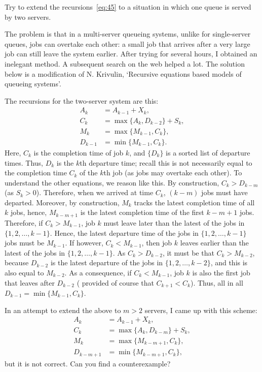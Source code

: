 \begin{extra} Try to extend the recursions~\cref{eq:45} to a situation in which one queue is
 served by two servers. 
\begin{hint} The problem is
 that in a multi-server queueing systems, unlike for
 single-server queues, jobs can overtake each other: a small job
 that arrives after a very large job can still leave the system
 earlier. After trying for several hours, I obtained an inelegant
 method. A subsequent search on the web helped a lot. The
 solution below is a modification of N. Krivulin, `Recursive
 equations based models of queueing systems'. 
\end{hint}
\begin{solution}
The recursions for the two-server system are this: 
 \begin{equation*}
 \begin{split}
 A_k &= A_{k-1} + X_k, \\
 C_k &= \max\{A_k, D_{k-2}\} + S_k,\\
 M_k &= \max\{M_{k-1}, C_k\}, \\
 D_{k-1} &= \min\{M_{k-1}, C_k\}.
 \end{split}
 \end{equation*}
 Here, $C_k$ is the completion time of job $k$, and $\{D_k\}$ is
 a sorted list of departure times. Thus, $D_k$ is the $k$th
 departure time; recall this is not necessarily equal to the
 completion time $C_k$ of the $k$th job (as jobs may overtake
 each other). To understand the other equations, we reason like
 this. By construction, $C_k > D_{k-m}$ (as $S_k >0$).
 Therefore, when we arrived at time $C_k$, $(k-m)$ jobs must have
 departed. Moreover, by construction, $M_k$ tracks the latest
 completion time of all $k$ jobs, hence, $M_{k-m+1}$ is the latest
 completion time of the first $k-m+1$ jobs. Therefore, if
 $C_k>M_{k-1}$, job $k$ must leave later than the latest of the
 jobs in $\{1,2,\ldots, k-1\}$. Hence, the latest departure time
 of the jobs in $\{1, 2, \ldots, k-1\}$ jobs must be
 $M_{k-1}$. If however, $C_k<M_{k-1}$, then job $k$ leaves
 earlier than the latest of the jobs in $\{1,2,\ldots, k-1\}$. As
 $C_k>D_{k-2}$, it must be that $C_k > M_{k-2}$, because
 $D_{k-2}$ is the latest departure of the jobs in
 $\{1,2,\ldots, k-2\}$, and this is also equal to $M_{k-2}$. As a
 consequence, if $C_k < M_{k-1}$, job $k$ is also the first job
 that leaves after $D_{k-2}$ ( provided of course that
 $C_{k+1} < C_k$). Thus, all in all
 $D_{k-1} = \min\{M_{k-1}, C_k\}$.

In an attempt to extend the above to $m>2$ servers, I came up with this scheme:
 \begin{equation*}
 \begin{split}
 A_k &= A_{k-1} + X_k, \\
 C_k &= \max\{A_k, D_{k-m}\} + S_k,\\
 M_k &= \max\{M_{k-m+1}, C_k\}, \\
 D_{k-m+1} &= \min\{M_{k-m+1}, C_k\},
 \end{split}
 \end{equation*}
 but it is not correct. Can you find a counterexample?
\end{solution}
\end{extra}
